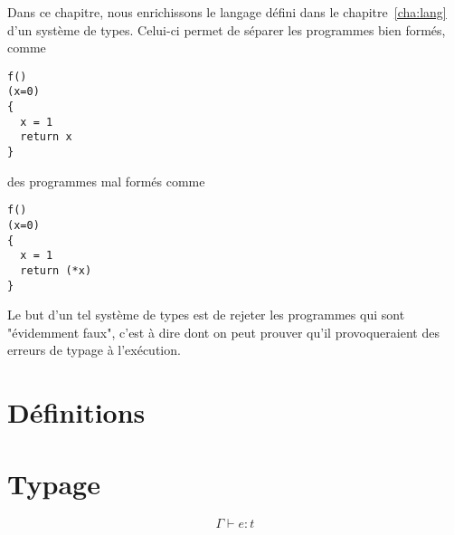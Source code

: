 Dans ce chapitre, nous enrichissons le langage défini dans le
chapitre~\ref{cha:lang} d'un système de types. Celui-ci permet de séparer les
programmes bien formés, comme

\begin{Verbatim}
f()
(x=0)
{
  x = 1
  return x
}
\end{Verbatim}

des programmes mal formés comme

\begin{Verbatim}
f()
(x=0)
{
  x = 1
  return (*x)
}
\end{Verbatim}

Le but d'un tel système de types est de rejeter les programmes qui sont
"évidemment faux", c'est à dire dont on peut prouver qu'il provoqueraient des
erreurs de typage à l'exécution.

\section{Définitions}



\section{Typage}

\begin{definition}

  \[
    Γ ⊢ e : t
  \]

\end{definition}

